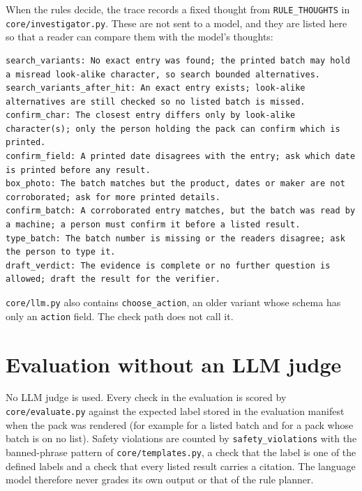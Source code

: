 When the rules decide, the trace records a fixed thought from \texttt{RULE\_THOUGHTS} in \texttt{core/investigator.py}. These are not sent to a model, and they are listed here so that a reader can compare them with the model's thoughts:
\begin{lstlisting}[language={},numbers=none,caption={Rule thoughts recorded when the rules decide},label={lst:app-rulethoughts}]
search_variants: No exact entry was found; the printed batch may hold a misread look-alike character, so search bounded alternatives.
search_variants_after_hit: An exact entry exists; look-alike alternatives are still checked so no listed batch is missed.
confirm_char: The closest entry differs only by look-alike character(s); only the person holding the pack can confirm which is printed.
confirm_field: A printed date disagrees with the entry; ask which date is printed before any result.
box_photo: The batch matches but the product, dates or maker are not corroborated; ask for more printed details.
confirm_batch: A corroborated entry matches, but the batch was read by a machine; a person must confirm it before a listed result.
type_batch: The batch number is missing or the readers disagree; ask the person to type it.
draft_verdict: The evidence is complete or no further question is allowed; draft the result for the verifier.
\end{lstlisting}

\texttt{core/llm.py} also contains \texttt{choose\_action}, an older variant whose schema has only an \texttt{action} field. The check path does not call it.

\section{Evaluation without an LLM judge}
\label{sec:app-prompts-judge}

No LLM judge is used. Every check in the evaluation is scored by \texttt{core/evaluate.py} against the expected label stored in the evaluation manifest when the pack was rendered (for example \FLAGGED{} for a listed batch and \NLISTED{} for a pack whose batch is on no list). Safety violations are counted by \texttt{safety\_violations} with the banned-phrase pattern of \texttt{core/templates.py}, a check that the label is one of the defined labels and a check that every listed result carries a citation. The language model therefore never grades its own output or that of the rule planner.
